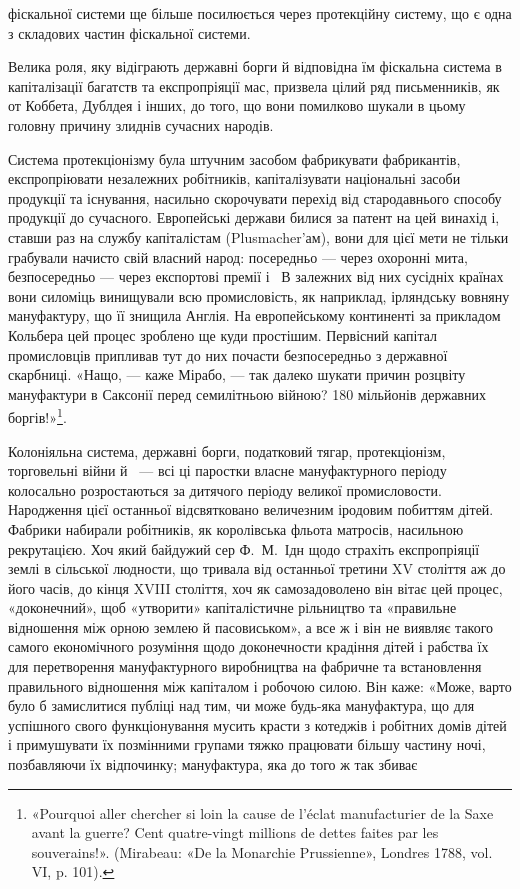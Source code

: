 \parcont{}  %
фіскальної системи ще більше посилюється через протекційну систему, що є одна з складових частин
фіскальної системи.

Велика роля, яку відіграють державні борги й відповідна їм фіскальна система в капіталізації
багатств та експропріяції мас, призвела цілий ряд письменників, як от Коббета, Дублдея і інших, до
того, що вони помилково шукали в цьому головну
причину злиднів сучасних народів.

Система протекціонізму була штучним засобом фабрикувати фабрикантів, експропріювати незалежних
робітників, капіталізувати національні засоби продукції та існування, насильно скорочувати перехід
від стародавнього способу продукції до сучасного. Европейські держави билися за патент на цей
винахід і, ставши раз на службу капіталістам (Plusmacher’ам), вони для цієї мети не тільки грабували
начисто свій власний народ: посередньо — через охоронні мита, безпосередньо — через експортові
премії і~ В залежних від них сусідніх країнах вони силоміць
винищували всю промисловість, як наприклад, ірляндську вовняну мануфактуру, що її знищила Англія. На
европейському континенті за прикладом Кольбера цей процес зроблено ще куди простішим. Первісний
капітал промисловців припливав тут до
них почасти безпосередньо з державної скарбниці. «Нащо, — каже Мірабо, — так далеко шукати причин
розцвіту мануфактури в Саксонії перед семилітньою війною? 180 мільйонів державних боргів!»\footnote{
«Pourquoi aller chercher si loin la cause de l’éclat manufacturier de la Saxe avant la guerre?
Cent quatre-vingt millions de dettes faites par les souverains!». (Mirabeau: «De la Monarchie
Prussienne», Londres 1788, vol. VI, p. 101).
}.

Колоніяльна система, державні борги, податковий тягар, протекціонізм, торговельні війни й~ —
всі ці паростки власне мануфактурного періоду колосально розростаються за дитячого періоду великої
промисловости. Народження цієї останньої
відсвятковано величезним іродовим побиттям дітей. Фабрики набирали робітників, як королівська фльота
матросів, насильною рекрутацією. Хоч який байдужий сер Ф.~М.~Ідн щодо страхіть експропріяції землі в
сільської людности, що тривала від останньої
третини XV століття аж до його часів, до кінця XVIII століття, хоч як самозадоволено він вітає цей
процес, «доконечний», щоб «утворити» капіталістичне рільництво та «правильне відношення між орною
землею й пасовиськом», а все ж і він не виявляє такого самого економічного розуміння щодо
доконечности крадіння дітей і рабства їх для перетворення мануфактурного виробництва на фабричне та
встановлення правильного відношення між капіталом і робочою силою. Він каже: «Може, варто було б
замислитися публіці над тим, чи може будь-яка мануфактура, що для успішного свого функціонування
мусить красти з котеджів і робітних домів дітей і примушувати їх позмінними групами тяжко працювати
більшу частину ночі, позбавляючи їх відпочинку; мануфактура, яка до того ж так збиває
\parbreak{}  %
